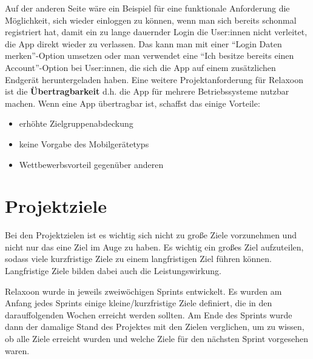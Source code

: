Auf der anderen Seite wäre ein Beispiel für eine funktionale Anforderung die Möglichkeit, sich wieder einloggen zu
können, wenn man sich bereits schonmal registriert hat, damit ein zu lange dauernder Login die User:innen
nicht verleitet, die App direkt wieder zu verlassen. Das kann man mit einer "`Login Daten merken"'-Option umsetzen
oder man verwendet eine "`Ich besitze bereits einen Account"'-Option bei User:innen, die sich die App auf einem
zusätzlichen Endgerät heruntergeladen haben. Eine weitere Projektanforderung für Relaxoon ist die
\textbf{Übertragbarkeit} d.h. die App für mehrere Betriebssysteme nutzbar machen. Wenn eine App übertragbar ist,
schaffst das einige Vorteile:
\begin{itemize}
      \item erhöhte Zielgruppenabdeckung
      \item keine Vorgabe des Mobilgerätetyps
      \item Wettbewerbsvorteil gegenüber anderen
\end{itemize}

\section{Projektziele}


Bei den Projektzielen ist es wichtig sich nicht zu große Ziele vorzunehmen und nicht nur das eine Ziel im Auge zu haben.
Es wichtig ein großes Ziel aufzuteilen, sodass viele kurzfristige Ziele zu einem langfristigen Ziel führen können.
Langfristige Ziele bilden dabei auch die Leistungswirkung.

Relaxoon wurde in jeweils zweiwöchigen Sprints entwickelt. Es wurden am Anfang jedes Sprints einige 
kleine/kurzfristige Ziele definiert, die in den darauffolgenden Wochen erreicht werden sollten. Am Ende des 
Sprints wurde dann der damalige Stand des Projektes mit den Zielen verglichen, um zu wissen, ob alle Ziele 
erreicht wurden und welche Ziele für den nächsten Sprint vorgesehen waren.


